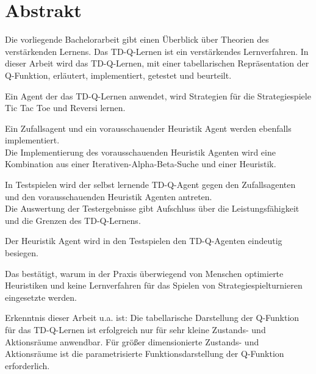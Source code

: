 \chapter*{Abstrakt}

Die vorliegende Bachelorarbeit gibt einen Überblick über Theorien des verstärkenden Lernens.
Das TD-Q-Lernen ist ein verstärkendes Lernverfahren. In dieser Arbeit wird das TD-Q-Lernen, mit einer tabellarischen Repräsentation der Q-Funktion, erläutert, implementiert, getestet und beurteilt.
 
Ein Agent der das TD-Q-Lernen anwendet, wird Strategien für die Strategiespiele Tic Tac Toe und Reversi lernen.

Ein Zufallsagent und ein vorausschauender Heuristik Agent werden ebenfalls implementiert. \\

Die Implementierung des vorausschauenden Heuristik Agenten wird eine Kombination aus einer Iterativen-Alpha-Beta-Suche und einer Heuristik. 

In Testspielen wird der selbst lernende TD-Q-Agent gegen den Zufallsagenten und den vorausschauenden Heuristik Agenten antreten. \\

Die Auswertung der Testergebnisse gibt Aufschluss über die Leistungsfähigkeit und die Grenzen des TD-Q-Lernens. 

Der Heuristik Agent wird in den Testspielen den TD-Q-Agenten eindeutig besiegen. 

Das bestätigt, warum in der Praxis überwiegend von Menschen optimierte Heuristiken und keine Lernverfahren für das Spielen von Strategiespielturnieren eingesetzte werden.

Erkenntnis dieser Arbeit u.a. ist: Die tabellarische Darstellung der Q-Funktion für das TD-Q-Lernen ist erfolgreich nur für sehr kleine Zustands- und Aktionsräume anwendbar. Für größer dimensionierte Zustands- und Aktionsräume ist die parametrisierte Funktionsdarstellung der Q-Funktion erforderlich. 




